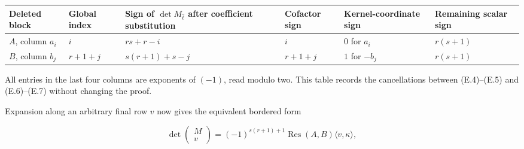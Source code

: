 \documentclass[
  11pt,
  a4paper,
]{article}
\newcounter{none} %
\begin{document}
{\def\LTcaptype{none} %
\begin{longtable}[]{@{}
  >{\raggedright\arraybackslash}p{}
  >{\raggedleft\arraybackslash}p{}
  >{\raggedleft\arraybackslash}p{}
  >{\raggedleft\arraybackslash}p{}
  >{\raggedleft\arraybackslash}p{}
  >{\raggedleft\arraybackslash}p{}@{}}
\toprule\noalign{}
\begin{minipage}[b]{\linewidth}\raggedright
Deleted block
\end{minipage} & \begin{minipage}[b]{\linewidth}\raggedleft
Global index
\end{minipage} & \begin{minipage}[b]{\linewidth}\raggedleft
Sign of \(\det M_{\widehat\ell}\) after coefficient substitution
\end{minipage} & \begin{minipage}[b]{\linewidth}\raggedleft
Cofactor sign
\end{minipage} & \begin{minipage}[b]{\linewidth}\raggedleft
Kernel-coordinate sign
\end{minipage} & \begin{minipage}[b]{\linewidth}\raggedleft
Remaining scalar sign
\end{minipage} \\
\midrule\noalign{}
\endhead
\bottomrule\noalign{}
\endlastfoot
\(A\), column \(a_i\) & \(i\) & \(rs+r-i\) & \(i\) & \(0\) for \(a_i\) &
\(r(s+1)\) \\
\(B\), column \(b_j\) & \(r+1+j\) & \(s(r+1)+s-j\) & \(r+1+j\) & \(1\)
for \(-b_j\) & \(r(s+1)\) \\
\end{longtable}
}

All entries in the last four columns are exponents of \((-1)\), read
modulo two. This table records the cancellations between (E.4)--(E.5)
and (E.6)--(E.7) without changing the proof.

Expansion along an arbitrary final row \(v\) now gives the equivalent
bordered form

\[
 \det\begin{pmatrix}M\\v\end{pmatrix}
 =(-1)^{s(r+1)+1}\operatorname{Res}(A,B)
   \langle v,\kappa\rangle,
\]
\end{document}
